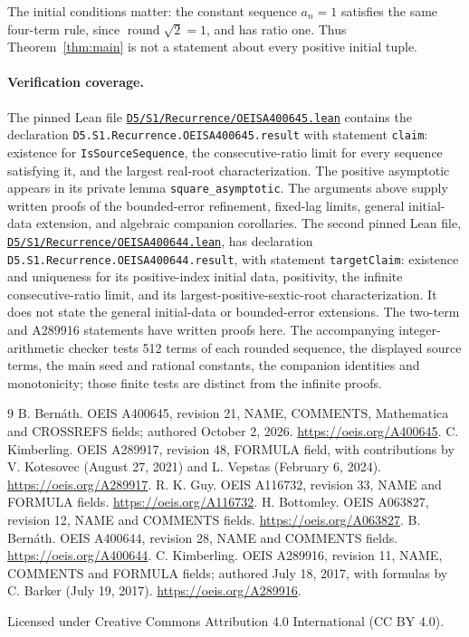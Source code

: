 \documentclass[11pt]{article}
\begin{document}
The initial conditions matter: the constant sequence $a_n=1$ satisfies
the same four-term rule, since $\operatorname{round}\sqrt2=1$, and has
ratio one. Thus Theorem~\ref{thm:main} is not a statement about every
positive initial tuple.

\paragraph{Verification coverage.}
The pinned Lean file
\href{https://github.com/the-omega-institute/trureturing/blob/6974dba01daa1a25cc74b87a86c191e95fe2c681/D5/S1/Recurrence/OEISA400645.lean}{\texttt{D5/S1/Recurrence/OEISA400645.lean}}
contains the declaration
\texttt{D5.S1.Recurrence.OEISA400645.result} with statement
\texttt{claim}: existence for \texttt{IsSourceSequence}, the
consecutive-ratio limit for every sequence satisfying it, and the largest
real-root characterization. The positive asymptotic appears in its
private lemma \texttt{square\_asymptotic}. The arguments above supply
written proofs of the bounded-error refinement, fixed-lag limits,
general initial-data extension, and algebraic companion corollaries.
The second pinned Lean file,
\href{https://github.com/the-omega-institute/trureturing/blob/6974dba01daa1a25cc74b87a86c191e95fe2c681/D5/S1/Recurrence/OEISA400644.lean}{\texttt{D5/S1/Recurrence/OEISA400644.lean}},
has declaration \texttt{D5.S1.Recurrence.OEISA400644.result},
with statement \texttt{targetClaim}:
existence and uniqueness for its positive-index initial data, positivity,
the infinite consecutive-ratio limit, and its largest-positive-sextic-root
characterization. It does not state the general initial-data or
bounded-error extensions. The two-term and A289916 statements have written
proofs here. The accompanying integer-arithmetic checker tests 512 terms
of each rounded sequence, the displayed source terms, the main seed and
rational constants, the companion identities and monotonicity; those
finite tests are distinct from the infinite proofs.

\begin{thebibliography}{9}
 B. Bern\'ath.
OEIS A400645, revision 21, NAME, COMMENTS, Mathematica and CROSSREFS
fields; authored October 2, 2026.
\url{https://oeis.org/A400645}.
 C. Kimberling.
OEIS A289917, revision 48, FORMULA field, with contributions by
V. Kotesovec (August 27, 2021) and L. Vepstas (February 6, 2024).
\url{https://oeis.org/A289917}.
 R. K. Guy.
OEIS A116732, revision 33, NAME and FORMULA fields.
\url{https://oeis.org/A116732}.
 H. Bottomley.
OEIS A063827, revision 12, NAME and COMMENTS fields.
\url{https://oeis.org/A063827}.
 B. Bern\'ath.
OEIS A400644, revision 28, NAME and COMMENTS fields.
\url{https://oeis.org/A400644}.
 C. Kimberling.
OEIS A289916, revision 11, NAME, COMMENTS and FORMULA fields;
authored July 18, 2017, with formulas by C. Barker (July 19, 2017).
\url{https://oeis.org/A289916}.
\end{thebibliography}
\medskip
\noindent\small Licensed under Creative Commons Attribution 4.0
International (CC BY 4.0).
\end{document}
